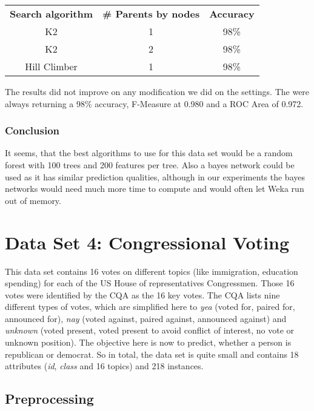 \documentclass{article}
\begin{document}
\begin{center}
\begin{tabular}{ c | c | c }
\textbf{Search algorithm} & \textbf{\# Parents by nodes} & \textbf{Accuracy}\\
K2 & 1 & 98\% \\
K2 & 2 & 98\% \\
Hill Climber& 1 & 98\% \\
\end{tabular}
\end{center}

The results did not improve on any modification we did on the settings. The were always returning a 98\% accuracy, F-Measure at 0.980 and a ROC Area of 0.972.


\subsubsection{Conclusion}
It seems, that the best algorithms to use for this data set would be a random forest with 100 trees and 200 features per tree. Also a bayes network could be used as it has similar prediction qualities, although in our experiments the bayes networks would need much more time to compute and would often let Weka run out of memory.


\section{Data Set 4: Congressional Voting}
This data set contains 16 votes on different topics (like immigration, education spending) for each of the US House of representatives Congressmen. Those 16 votes were identified by the CQA as the 16 key votes. The CQA lists nine different types of votes, which are simplified here to \emph{yea} (voted for, paired for, announced for), \emph{nay} (voted against, paired against, announced against) and \emph{unknown} (voted present, voted present to avoid conflict of interest, no vote or unknown position). The objective here is now to predict, whether a person is republican or democrat. 
So in total, the data set is quite small and contains 18 attributes (\emph{id}, \emph{class} and 16 topics) and 218 instances. 

\subsection{Preprocessing}
 
\end{document}
